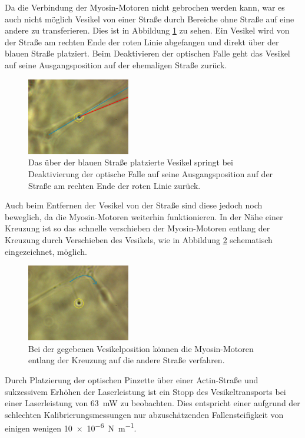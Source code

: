         \FloatBarrier 
        Da die Verbindung der Myosin-Motoren nicht gebrochen werden kann, war es auch nicht möglich Vesikel von einer Straße durch Bereiche ohne Straße auf eine andere zu transferieren. Dies ist in Abbildung
        \ref{fig:vesikel_overlap} zu sehen. Ein Vesikel wird von der Straße am rechten Ende der roten Linie abgefangen und direkt über der blauen Straße platziert. Beim Deaktivieren der optischen Falle geht das 
        Vesikel auf seine Ausgangsposition auf der ehemaligen Straße zurück. 
        \FloatBarrier
        \begin{figure}[h]
        \centering
        \includegraphics[width = 0.4\textwidth]{pictures/vesikel_overlap.png}
        \caption{Das über der blauen Straße platzierte Vesikel springt bei Deaktivierung der optische Falle auf seine Ausgangsposition auf der Straße am rechten Ende der roten Linie zurück.}
        \label{fig:vesikel_overlap}
        \end{figure}
        \FloatBarrier 
        \newpage
        Auch beim Entfernen der Vesikel von der Straße sind diese jedoch noch beweglich, da die Myosin-Motoren weiterhin funktionieren. In der Nähe einer Kreuzung ist so das schnelle verschieben der 
        Myosin-Motoren entlang der Kreuzung durch Verschieben des Vesikels, wie in Abbildung \ref{fig:vesikel_sprung} schematisch eingezeichnet, möglich.
        \FloatBarrier
        \begin{figure}[h]
        \centering
        \includegraphics[width = 0.4\textwidth]{pictures/vesikel_transport.png}
        \caption{Bei der gegebenen Vesikelposition können die Myosin-Motoren entlang der Kreuzung auf die andere Straße verfahren.}
        \label{fig:vesikel_sprung}
        \end{figure}
        \FloatBarrier 
        Durch Platzierung der optischen Pinzette über einer Actin-Straße und sukzessivem Erhöhen der Laserleistung ist ein Stopp des Vesikeltransports bei einer Laserleistung von \SI{63}{\milli\watt} zu 
        beobachten. Dies entspricht einer aufgrund der schlechten Kalibrierungsmessungen nur abzuschätzenden Fallensteifigkeit von einigen wenigen \SI{10e-6}{\newton\per\metre}. 